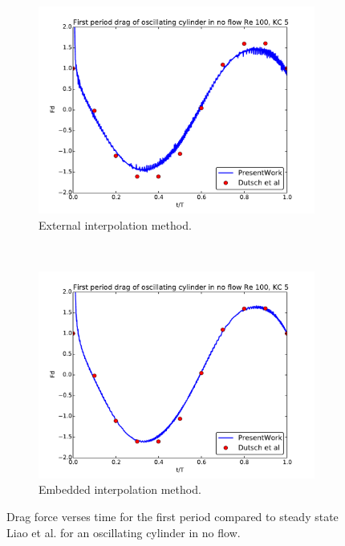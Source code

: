 \documentclass[onehalf,11pt]{beavtex}
\begin{document}
\begin{figure}[htb]
	\centering
	\begin{subfigure}{0.4\textwidth}
		\includegraphics[width=\linewidth]{staticexinit}
		\caption{External interpolation method.}
	\end{subfigure}
	~
	\begin{subfigure}{0.4\textwidth}
		\includegraphics[width=\linewidth]{staticeminit}
		\caption{Embedded interpolation method.}
	\end{subfigure}
	\caption{Drag force verses time for the first period compared to steady state Liao et al. for an oscillating cylinder in no flow.}
	\label{fig:staticInit}
\end{figure}
\end{document}

